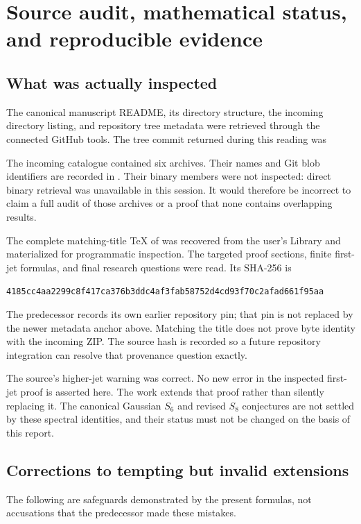 \section{Source audit, mathematical status, and reproducible evidence}
\label{hqj:sec:audit}

\subsection{What was actually inspected}
The canonical manuscript README, its directory structure, the incoming
directory listing, and repository tree metadata were retrieved through
the connected GitHub tools. The tree commit returned during this
reading was
\begin{center}\small\pin\end{center}
The incoming catalogue contained six archives. Their names and Git blob
identifiers are recorded in . Their binary members
were not inspected: direct binary retrieval was unavailable in this
session. It would therefore be incorrect to claim a full audit of those
archives or a proof that none contains overlapping results.

The complete matching-title TeX of
 was recovered
from the user's Library and materialized for programmatic inspection.
The targeted proof sections, finite first-jet formulas, and final
research questions were read. Its SHA-256 is
\begin{center}\small
\nolinkurl{4185cc4aa2299c8f417ca376b3ddc4af3fab58752d4cd93f70c2afad661f95aa}
\end{center}
The predecessor records its own earlier repository pin; that pin is not
replaced by the newer metadata anchor above. Matching the title does
not prove byte identity with the incoming ZIP. The source hash is
recorded so a future repository integration can resolve that provenance
question exactly.

The source's higher-jet warning was correct. No new error in the
inspected first-jet proof is asserted here. The work extends that proof
rather than silently replacing it. The canonical Gaussian $S_6$ and
revised $S_8$ conjectures are not settled by these spectral identities,
and their status must not be changed on the basis of this report.

\subsection{Corrections to tempting but invalid extensions}
The following are safeguards demonstrated by the present formulas,
not accusations that the predecessor made these mistakes.

